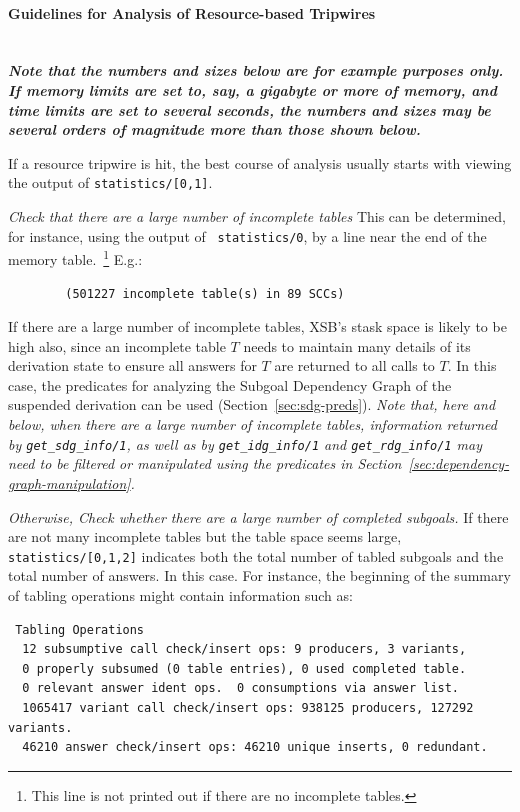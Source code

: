\paragraph{Guidelines for Analysis of Resource-based Tripwires}  \ \\

{\bf {\em Note that the numbers and sizes below are for example
    purposes only.  If memory limits are set to, say, a gigabyte or
    more of memory, and time limits are set to several seconds, the
    numbers and sizes may be several orders of magnitude more than
    those shown below.}}

If a resource tripwire is hit, the best course of analysis usually
starts with viewing the output of {\tt statistics/[0,1]}.  
\bi
\item {\em Check that there are a large number of incomplete tables}
  This can be determined, for instance, using the output of {\tt
    statistics/0}, by a line near the end of the memory
  table.~\footnote{This line is not printed out if there are no
    incomplete tables.}  E.g.:
%
{\small \begin{verbatim}
        (501227 incomplete table(s) in 89 SCCs)
\end{verbatim} }

\bi
\item If there are a large number of incomplete tables, XSB's stask
 space is likely to be high also, since an incomplete table $T$ needs
 to maintain many details of its derivation state to ensure all
 answers for $T$ are returned to all calls to $T$.  In this case, the
 predicates for analyzing the Subgoal Dependency Graph of the
 suspended derivation can be used (Section~\ref{sec:sdg-preds}).  {\em
 Note that, here and below, when there are a large number of
 incomplete tables, information returned by {\tt get\_sdg\_info/1}, as
 well as by {\tt get\_idg\_info/1} and {\tt get\_rdg\_info/1} may need
 to be filtered or manipulated using the predicates in
 Section~\ref{sec:dependency-graph-manipulation}.}
\ei

\item {\em Otherwise, Check whether there are a large number of
 completed subgoals.} If there are not many incomplete
 tables but the table space seems large, {\tt statistics/[0,1,2]}
 indicates both the total number of tabled subgoals and the total
 number of answers.  In this case.  For instance, the beginning of the
 summary of tabling operations might contain information such as:

%
{\small 
\begin{verbatim}
 Tabling Operations
  12 subsumptive call check/insert ops: 9 producers, 3 variants,
  0 properly subsumed (0 table entries), 0 used completed table.
  0 relevant answer ident ops.  0 consumptions via answer list.
  1065417 variant call check/insert ops: 938125 producers, 127292 variants.
  46210 answer check/insert ops: 46210 unique inserts, 0 redundant.
\end{verbatim} } 

